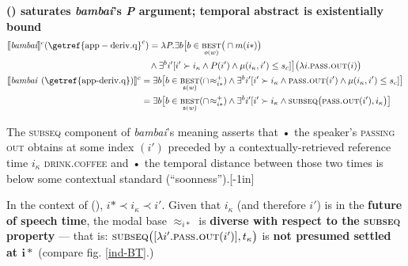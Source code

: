 \a \textbf{ () saturates \textit{bambai}'s \textit{P} argument; temporal abstract is existentially bound}
\begin{align*}
	&\begin{aligned}
	\denote[c]{\textit{bambai}}(\mathrm{\getref{app-deriv.q}}^c )&=\lambda\textit{P}.\exists b	\big[b\in\underset{o(w)}{\textsc{best}}\big(\cap m(i*)\big)\\&\wedge \exists^bi'[i'\succ i_\kappa\wedge P(i')\wedge\mu(i_\kappa,i')\leq s_c]\big]\big(\lambda i.\textsc{pass.out}(i)\big)\end{aligned}\\
&\begin{aligned}\denote[c]{\textit{bambai \textup{(\getref{app-deriv.q})}}}&=\exists b\big[b\in\underset{\mathfrak s(w)}{\textsc{best}}(\cap\!\approx^+_{i*})\wedge \exists^bi'[i'\succ i_\kappa\wedge\textsc{pass.out}(i')\wedge\mu(i_\kappa,i')\leq s_c]\big]\\
	&=\exists b\big[b\in\underset{\mathfrak s(w)}{\textsc{best}}(\cap\!\approx^+_{i*})\wedge \exists^bi'[i'\succ i_\kappa\wedge \textsc{subseq}\big(\textsc{pass.out}(i'),i_\kappa\big)\big]\end{aligned}
\end{align*}




The \textsc{subseq} component of \textit{bambai}'s meaning asserts that • the speaker's \textsc{passing out} obtains at some index $ (i') $ preceded by a contextually-retrieved reference time $ i_\kappa $ \textsc{drink.coffee} and • the temporal distance between those two times is below some contextual standard (``soonness'').[-1in]


\xe


In the context of (), $ i*\prec i_\kappa\prec i' $. Given that $ i_\kappa $ (and therefore $ i' $) is in the \textbf{future of speech time}, the modal base $ \approx_{i*} $ is \textbf{diverse with respect to the \textsc{subseq} property} --- that is: $ \textsc{subseq}\big([\lambda i'.\textsc{pass.out}(i')],t_\kappa\big) $ is \textbf{not presumed settled at $ \boldsymbol{i*} $} (compare fig. \ref{ind-BT}.)


